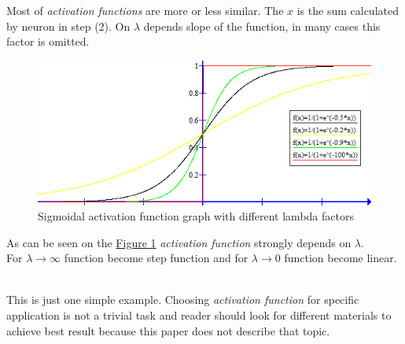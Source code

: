 Most of \textit{activation functions} are more or less similar. The $x$ is the sum calculated by neuron in step (2). On $\lambda$ depends slope of the function, in many cases this factor is omitted. 

\newpage

\begin{figure}[!h]
    \centering
    \includegraphics[scale=1]{Media/sgm_graph.png}
    \caption[Sigmoidal activation function graph]{Sigmoidal activation function graph with different lambda factors}
    \label{fig:SigmoidalFunctionGraph}
\end{figure}

As can be seen on the \hyperref[fig:SigmoidalFunctionGraph]{Figure \ref{fig:SigmoidalFunctionGraph}} \textit{activation function} strongly depends on $\lambda$. \\
For $\lambda \rightarrow \infty$ function become step function and for $\lambda \rightarrow 0$ function become linear.

\ \\

This is just one simple example. Choosing \textit{activation function} for specific application is not a trivial task and reader should look for different materials to achieve best result because this paper does not describe that topic.
